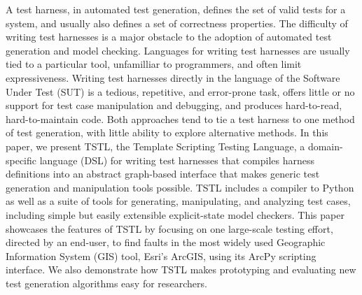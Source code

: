 A test harness, in automated test generation, defines the set of valid tests
for a system, and usually also defines a set of correctness
properties.  The difficulty of writing test harnesses is a major
obstacle to the adoption of automated test generation and model
checking.  Languages for writing test harnesses are usually tied to a
particular tool, unfamilliar to programmers, and often limit
expressiveness.  Writing test harnesses directly in the language of
the Software Under Test (SUT) is a tedious, repetitive, and
error-prone task, offers little or no support for test case
manipulation and debugging, and produces hard-to-read, hard-to-maintain
code.  Both approaches tend to tie a test harness to one method of
test generation, with little ability to explore alternative methods.
In this paper, we present TSTL, the Template Scripting Testing
Language, a domain-specific language (DSL) for writing test harnesses
that compiles harness definitions into an abstract graph-based
interface that makes generic
test generation and manipulation tools possible.  TSTL includes a
compiler to Python as well as a suite of tools for generating, manipulating,
and analyzing test cases, including simple but easily extensible explicit-state model
checkers.  This paper showcases the features of TSTL by focusing on
one large-scale testing effort, directed by an end-user, to find
faults in the most widely used Geographic Information System (GIS) tool,
Esri's ArcGIS, using its ArcPy scripting interface.  We also
demonstrate how TSTL makes prototyping and evaluating new test
generation algorithms easy for researchers.


